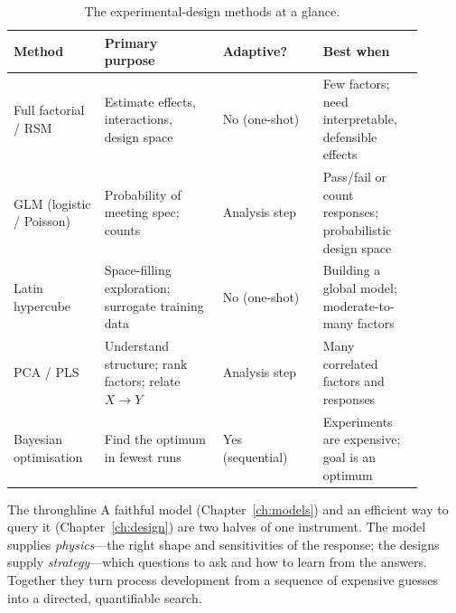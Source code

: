 \begin{table}[h]
\centering
\renewcommand{\arraystretch}{1.35}
\caption{The experimental-design methods at a glance.}
\label{tab:compare}
\begin{tabular}{@{}p{0.20\linewidth} p{0.26\linewidth} p{0.22\linewidth}
                  p{0.22\linewidth}@{}}
\toprule
\textbf{Method} & \textbf{Primary purpose} & \textbf{Adaptive?} &
\textbf{Best when} \\
\midrule
Full factorial / RSM & Estimate effects, interactions, design space &
No (one-shot) & Few factors; need interpretable, defensible effects \\
GLM (logistic / Poisson) & Probability of meeting spec; counts &
Analysis step & Pass/fail or count responses; probabilistic design space \\
Latin hypercube & Space-filling exploration; surrogate training data &
No (one-shot) & Building a global model; moderate-to-many factors \\
PCA / PLS & Understand structure; rank factors; relate $X\!\to\!Y$ &
Analysis step & Many correlated factors and responses \\
Bayesian optimisation & Find the optimum in fewest runs &
Yes (sequential) & Experiments are expensive; goal is an optimum \\
\bottomrule
\end{tabular}
\end{table}

\begin{keybox}{The throughline}
A faithful model (Chapter~\ref{ch:models}) and an efficient way to query it
(Chapter~\ref{ch:design}) are two halves of one instrument. The model supplies
\emph{physics}---the right shape and sensitivities of the response; the designs
supply \emph{strategy}---which questions to ask and how to learn from the
answers. Together they turn process development from a sequence of expensive
guesses into a directed, quantifiable search.
\end{keybox}
